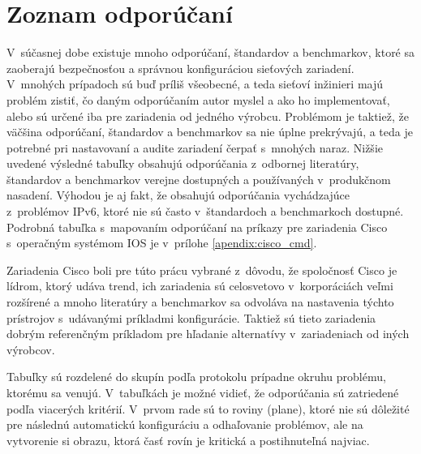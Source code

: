\newpage
\section{Zoznam odporúčaní}

V~súčasnej dobe existuje mnoho odporúčaní, štandardov a benchmarkov, ktoré sa zaoberajú bezpečnosťou a správnou konfiguráciou sieťových zariadení. V~mnohých prípadoch sú buď príliš všeobecné, a teda sieťoví inžinieri majú problém zistiť, čo daným odporúčaním autor myslel a ako ho implementovať, alebo sú určené iba pre zariadenia od jedného výrobcu. Problémom je taktiež, že väčšina odporúčaní, štandardov a benchmarkov sa nie úplne prekrývajú, a teda je potrebné pri nastavovaní a audite zariadení čerpať s~mnohých naraz. Nižšie uvedené výsledné tabuľky obsahujú odporúčania z~odbornej literatúry, štandardov a benchmarkov verejne dostupných a používaných v~produkčnom nasadení. Výhodou je aj fakt, že obsahujú odporúčania vychádzajúce z~problémov IPv6, ktoré nie sú často v~štandardoch a benchmarkoch dostupné. Podrobná tabuľka s~mapovaním odporúčaní na príkazy pre zariadenia Cisco s~operačným systémom IOS je v~prílohe \ref{apendix:cisco_cmd}.

Zariadenia Cisco boli pre túto prácu vybrané z~dôvodu, že spoločnosť Cisco je lídrom, ktorý udáva trend, ich zariadenia sú celosvetovo v~korporáciách veľmi rozšírené a mnoho literatúry a benchmarkov sa odvoláva na nastavenia týchto prístrojov s~udávanými príkladmi konfigurácie. Taktiež sú tieto zariadenia dobrým referenčným príkladom pre hľadanie alternatívy v~zariadeniach od iných výrobcov.

Tabuľky sú rozdelené do skupín podľa protokolu prípadne okruhu problému, ktorému sa venujú. V~tabuľkách je možné vidieť, že odporúčania sú zatriedené podľa viacerých kritérií. V~prvom rade sú to roviny (plane), ktoré nie sú dôležité pre následnú automatickú konfiguráciu a odhaľovanie problémov, ale na vytvorenie si obrazu, ktorá časť rovín je kritická a postihnuteľná najviac. 

